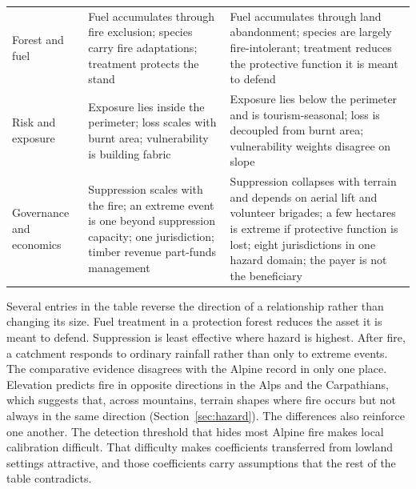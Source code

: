 \documentclass[11pt,a4paper]{article}
\begin{document}
\begin{table}[htbp]
\begin{tabularx}{\textwidth}{@{}>{\raggedright\arraybackslash}p{2.2cm} >{\raggedright\arraybackslash}X >{\raggedright\arraybackslash}X@{}}
Forest and fuel & Fuel accumulates through fire exclusion; species carry fire adaptations; treatment protects the stand & Fuel accumulates through land abandonment; species are largely fire-intolerant; treatment reduces the protective function it is meant to defend \\
Risk and exposure & Exposure lies inside the perimeter; loss scales with burnt area; vulnerability is building fabric & Exposure lies below the perimeter and is tourism-seasonal; loss is decoupled from burnt area; vulnerability weights disagree on slope \\
Governance and economics & Suppression scales with the fire; an extreme event is one beyond suppression capacity; one jurisdiction; timber revenue part-funds management & Suppression collapses with terrain and depends on aerial lift and volunteer brigades; a few hectares is extreme if protective function is lost; eight jurisdictions in one hazard domain; the payer is not the beneficiary \\
\bottomrule
\end{tabularx}
\end{table}

Several entries in the table reverse the direction of a relationship rather than changing its size. Fuel treatment in a protection forest reduces the asset it is meant to defend. Suppression is least effective where hazard is highest. After fire, a catchment responds to ordinary rainfall rather than only to extreme events. The comparative evidence disagrees with the Alpine record in only one place. Elevation predicts fire in opposite directions in the Alps and the Carpathians, which suggests that, across mountains, terrain shapes where fire occurs but not always in the same direction (Section~\ref{sec:hazard}). The differences also reinforce one another. The detection threshold that hides most Alpine fire makes local calibration difficult. That difficulty makes coefficients transferred from lowland settings attractive, and those coefficients carry assumptions that the rest of the table contradicts.
\end{document}
